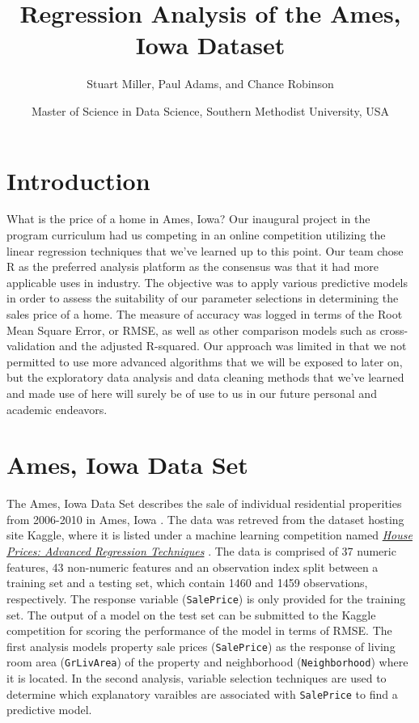 \documentclass[american,]{article}
\title{Regression Analysis of the Ames, Iowa Dataset}
\author{Stuart Miller, Paul Adams, and Chance Robinson}
\date{Master of Science in Data Science, Southern Methodist University, USA}
\begin{document}
\maketitle

\hypertarget{introduction}{%
\section{Introduction}\label{introduction}}

What is the price of a home in Ames, Iowa? Our inaugural project in the
program curriculum had us competing in an online competition utilizing
the linear regression techniques that we've learned up to this point.
Our team chose R as the preferred analysis platform as the consensus was
that it had more applicable uses in industry. The objective was to apply
various predictive models in order to assess the suitability of our
parameter selections in determining the sales price of a home. The
measure of accuracy was logged in terms of the Root Mean Square Error,
or RMSE, as well as other comparison models such as cross-validation and
the adjusted R-squared. Our approach was limited in that we not
permitted to use more advanced algorithms that we will be exposed to
later on, but the exploratory data analysis and data cleaning methods
that we've learned and made use of here will surely be of use to us in
our future personal and academic endeavors.

\hypertarget{ames-iowa-data-set}{%
\section{Ames, Iowa Data Set}\label{ames-iowa-data-set}}

The Ames, Iowa Data Set describes the sale of individual residential
properities from 2006-2010 in Ames, Iowa \cite{Cock}. The data was
retreved from the dataset hosting site Kaggle, where it is listed under
a machine learning competition named
\href{https://www.kaggle.com/c/house-prices-advanced-regression-techniques/overview}{\textit{House Prices: Advanced Regression Techniques}}
\cite{Kaggle2016}. The data is comprised of 37 numeric features, 43
non-numeric features and an observation index split between a training
set and a testing set, which contain 1460 and 1459 observations,
respectively. The response variable (\texttt{SalePrice}) is only
provided for the training set. The output of a model on the test set can
be submitted to the Kaggle competition for scoring the performance of
the model in terms of RMSE. The first analysis models property sale
prices (\texttt{SalePrice}) as the response of living room area
(\texttt{GrLivArea}) of the property and neighborhood
(\texttt{Neighborhood}) where it is located. In the second analysis,
variable selection techniques are used to determine which explanatory
varaibles are associated with \texttt{SalePrice} to find a predictive
model.
\end{document}
